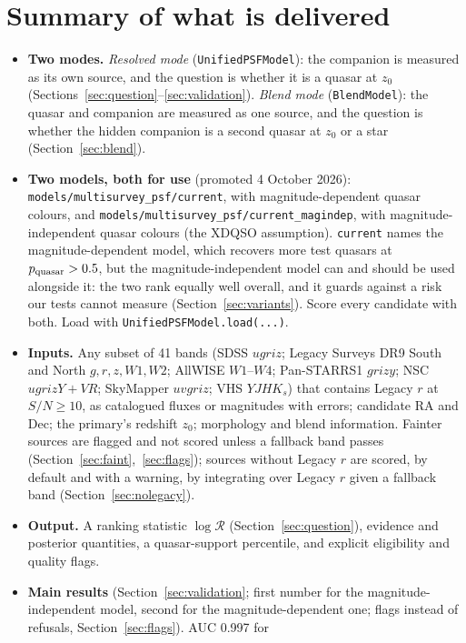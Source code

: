 \documentclass[11pt,a4paper]{article}
\newcommand{\R}{\mathcal{R}}
\newcommand{\code}[1]{\texttt{#1}}
\begin{document}
\section{Summary of what is delivered}
\begin{itemize}\sloppy
\item \textbf{Two modes.} \emph{Resolved mode} (\code{UnifiedPSFModel}): the companion is measured as its own
  source, and the question is whether it is a quasar at $z_0$ (Sections~\ref{sec:question}--\ref{sec:validation}).
  \emph{Blend mode} (\code{BlendModel}): the quasar and companion are measured as one source, and the question is
  whether the hidden companion is a second quasar at $z_0$ or a star (Section~\ref{sec:blend}).
\item \textbf{Two models, both for use} (promoted 4 October 2026): \code{models/multisurvey\_psf/current}, with
  magnitude-dependent quasar colours, and \code{models/multisurvey\_psf/current\_magindep}, with
  magnitude-independent quasar colours (the XDQSO assumption). \code{current} names the
  magnitude-dependent model, which recovers more test quasars at $p_{\rm quasar}>0.5$, but the
  magnitude-independent model can and should be used alongside it: the two rank equally well overall, and it
  guards against a risk our tests cannot measure (Section~\ref{sec:variants}). Score every candidate with both. Load with \code{UnifiedPSFModel.load(...)}.
\item \textbf{Inputs.} Any subset of 41 bands (SDSS $ugriz$; Legacy Surveys DR9 South and
  North $g,r,z,W1,W2$; AllWISE $W1$--$W4$; Pan-STARRS1 $grizy$; NSC $ugrizY{+}VR$; SkyMapper
  $uvgriz$; VHS $YJHK_s$) that contains Legacy $r$ at $S/N\geq10$, as catalogued fluxes or magnitudes
  with errors; candidate RA and Dec; the primary's redshift $z_0$; morphology and blend information.
  Fainter sources are flagged and not scored unless a fallback band passes (Section~\ref{sec:faint},~\ref{sec:flags}); sources without Legacy $r$ are scored,
  by default and with a warning, by integrating over Legacy $r$ given a fallback band (Section~\ref{sec:nolegacy}).
\item \textbf{Output.} A ranking statistic $\log\R$ (Section~\ref{sec:question}), evidence and posterior
  quantities, a quasar-support percentile, and explicit eligibility and quality flags.
\item \textbf{Main results} (Section~\ref{sec:validation}; first number for the magnitude-independent model,
  second for the magnitude-dependent one; flags instead of refusals, Section~\ref{sec:flags}). AUC 0.997 for

\end{itemize}
\end{document}
